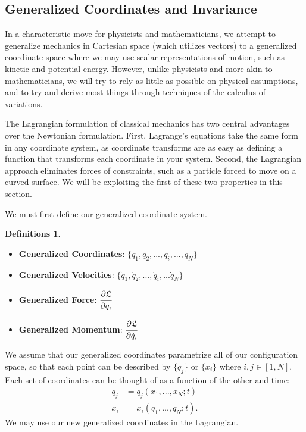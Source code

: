 \documentclass[10pt, psamsfonts]{amsart}
\theoremstyle{definition}
\newtheorem{defns}[thm]{Definitions}
\theoremstyle{remark}
\numberwithin{equation}{section}
\begin{document}
\subsection{Generalized Coordinates and Invariance}
In a characteristic move for physicists and mathematicians, we attempt to generalize mechanics in Cartesian space (which utilizes vectors) to a generalized coordinate space where we may use scalar representations of motion, such as kinetic and potential energy. 
However, unlike physicists and more akin to mathematicians, we will try to rely as little as possible on physical assumptions, and to try and derive most things through techniques of the calculus of variations.

The Lagrangian formulation of classical mechanics has two central advantages over the Newtonian formulation. First, Lagrange's equations take the same form in any coordinate system, as coordinate transforms are as easy as defining a function that transforms each coordinate in your system. Second, the Lagrangian approach eliminates forces of constraints, such as a particle forced to move on a curved surface. We will be exploiting the first of these two properties in this section. \cite[Arnold]{2}

We must first define our generalized coordinate system.
\begin{defns}
\;
\begin{itemize}
\item[] \textbf{Generalized Coordinates}: $\{q_1, q_2, ..., q_i,...,q_N\}$
\item[] \textbf{Generalized Velocities}: $\{\dot{q}_1, \dot{q}_2, ..., \dot{q}_i,...\dot{q}_N\}$
\item[] \textbf{Generalized Force}: $\cfrac{\partial \mathfrak{L}}{\partial q_i} $
\item[] \textbf{Generalized Momentum}: $\cfrac{\partial \mathfrak{L}}{\partial \dot{q}_i}$
\end{itemize}
\end{defns}
\noindent We assume that our generalized coordinates parametrize all of our configuration space, so that each point can be described by $\{q_j\}$ or $\{x_i\}$ where $i, j \in [1, N]$. Each set of coordinates can be thought of as a function of the other and time:
\begin{align*}
  q_j &= q_j(x_1,...,x_N; t)\\
  x_i &= x_i(q_1,...,q_N; t).
\end{align*}
We may use our new generalized coordinates in the Lagrangian.
\end{document}
